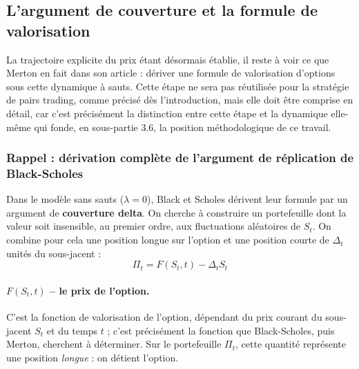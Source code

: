 \documentclass{article}
\begin{document}
\subsection{L'argument de couverture et la formule de valorisation}
La trajectoire explicite du prix étant désormais établie, il reste à voir ce que Merton en fait dans son article : dériver une formule de valorisation d'options sous cette dynamique à sauts. Cette étape ne sera pas réutilisée pour la stratégie de pairs trading, comme précisé dès l'introduction, mais elle doit être comprise en détail, car c'est précisément la distinction entre cette étape et la dynamique elle-même qui fonde, en sous-partie 3.6, la position méthodologique de ce travail.
\subsubsection*{Rappel : dérivation complète de l'argument de réplication de Black-Scholes}
Dans le modèle sans sauts ($\lambda=0$), Black et Scholes dérivent leur formule par un argument de \textbf{couverture delta}. On cherche à construire un portefeuille dont la valeur soit insensible, au premier ordre, aux fluctuations aléatoires de $S_t$. On combine pour cela une position longue sur l'option et une position courte de $\Delta_t$ unités du sous-jacent :
\begin{equation}
\Pi_t = F(S_t,t) - \Delta_t S_t
\end{equation}
\paragraph{$F(S_t,t)$ -- le prix de l'option.} C'est la fonction de valorisation de l'option, dépendant du prix courant du sous-jacent $S_t$ et du temps $t$ ; c'est précisément la fonction que Black-Scholes, puis Merton, cherchent à déterminer. Sur le portefeuille $\Pi_t$, cette quantité représente une position \emph{longue} : on détient l'option.
\end{document}
